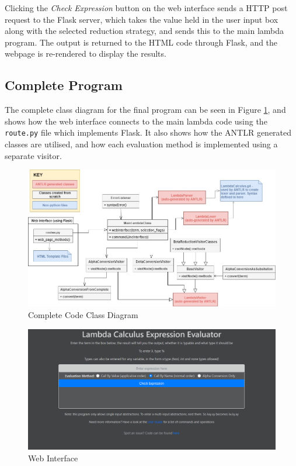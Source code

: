 \documentclass[a4paper,11pt]{report}
\begin{document}
Clicking the \textit{Check Expression} button on the web interface sends a HTTP post request to the Flask server, which takes the value held in the user input box along with the selected reduction strategy, and sends this to the main lambda program. The output is returned to the HTML code through Flask, and the webpage is re-rendered to display the results.

\subsection{Complete Program}
The complete class diagram for the final program can be seen in Figure \ref{class_diagram}, and shows how the web interface connects to the main lambda code using the \texttt{route.py} file which implements Flask. It also shows how the ANTLR generated classes are utilised, and how each evaluation method is implemented using a separate visitor.

\begin{figure}[p]
	\includegraphics[scale=0.4]{images/class_diagram}
	\centering
	\caption{Complete Code Class Diagram}
	\label{class_diagram}
\end{figure}

\begin{figure}[p]
	\includegraphics[scale=0.4]{images/web_interface_no_input}
	\centering
	\caption{Web Interface}
	\label{web_interface_no_input}
\end{figure}
\end{document}
